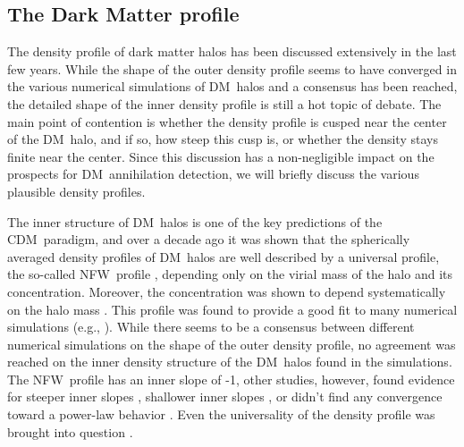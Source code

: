\documentclass[aps,prd,twocolumn,amsmath,amssymb,floatfix,nofootinbib,10pt]{revtex4}
\newcommand{\eg}{e.g.}
\newcommand{\CDM}{CDM}
\newcommand{\NFW}{NFW}
\newcommand{\DM}{DM}
\begin{document}
\subsection{The Dark Matter profile}


The density profile of dark matter halos has been discussed
extensively in the last few years. While the shape of the outer
density profile seems to have converged in the various numerical
simulations of \DM\ halos and a consensus has been reached, the
detailed shape of the inner density profile is still a hot topic of
debate. The main point of contention is whether the density profile is
cusped near the center of the \DM\ halo, and if so, how steep this
cusp is, or whether the density stays finite near the center. Since
this discussion has a non-negligible impact on the prospects for \DM\
annihilation detection, we will briefly discuss the various plausible
density profiles.

The inner structure of \DM\ halos is one of the key predictions of the
\CDM\ paradigm, and over a decade ago it was shown that the
spherically averaged density profiles of \DM\ halos are well described
by a universal profile, the so-called \NFW\ profile
\cite{1995MNRAS.275..720N,1996ApJ...462..563N,1997ApJ...490..493N},
depending only on the virial mass of the halo and its
concentration. Moreover, the concentration was shown to depend
systematically on the halo mass
\cite{1996ApJ...462..563N,1997ApJ...490..493N,2001MNRAS.321..559B,2001ApJ...554..114E,2007MNRAS.381.1450N,2008MNRAS.387..536G}. This
profile was found to provide a good fit to many numerical simulations
(\eg,
\cite{1996MNRAS.281..716C,1997MNRAS.286..865T,1997ApJS..111...73K}).
While there seems to be a consensus between different numerical
simulations on the shape of the outer density profile, no agreement
was reached on the inner density structure of the \DM\ halos found in
the simulations. The \NFW\ profile has an inner slope of -1, other
studies, however, found evidence for steeper inner slopes
\cite{1997ApJ...477L...9F,1998ApJ...499L...5M,1999MNRAS.310.1147M,2000ApJ...544..616G,2001ApJ...554..903K,2001ApJ...557..533F,2004MNRAS.353..624D},
shallower inner slopes \cite{1998ApJ...502...48K}, or didn't find any
convergence toward a power-law behavior
\cite{2003MNRAS.338...14P}. Even the universality of the density
profile was brought into question
\cite{2000ApJ...529L..69J,2000ApJ...535...30J}.
\end{document}
